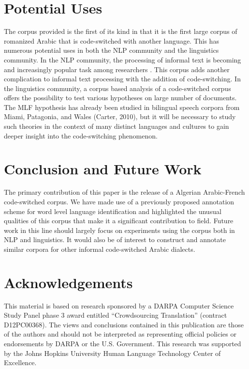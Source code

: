 \documentclass[10pt, a4paper]{article}
\begin{document}
\section{Potential Uses}
The corpus provided is the first of its kind in that it is the first
large corpus of romanized Arabic that is code-switched with another
language. This has numerous potential uses in both the NLP community
and the linguistics community. In the NLP community, the processing of
informal text is becoming and increasingly popular task among
researchers \cite{yang2013log}. This corpus adds another complication
to informal text processing with the addition of code-switching. In
the linguistics community, a corpus based analysis of a code-switched
corpus offers the possibility to test various hypotheses on large
number of documents. The MLF hypothesis has already been studied in
bilingual speech corpora from Miami, Patagonia, and Wales (Carter,
2010), but it will be necessary to study such theories in the context
of many distinct languages and cultures to gain deeper insight into
the code-switching phenomenon.


\section{Conclusion and Future Work}
The primary contribution of this paper is the release of a Algerian
Arabic-French code-switched corpus. We have made use of a previously
proposed annotation scheme for word level language identification and
highlighted the unusual qualities of this corpus that make it a
significant contribution to field. Future work in this line should
largely focus on experiments using the corpus both in NLP and
linguistics. It would also be of interest to construct and annotate
similar corpora for other informal code-switched Arabic dialects.


\section*{Acknowledgements}
This material is based on research sponsored by a DARPA Computer Science Study Panel phase 3 award entitled ``Crowdsourcing Translation'' (contract D12PC00368). The views and conclusions contained in this publication are those of the authors and should not be interpreted as representing official policies or endorsements by DARPA or the U.S. Government. This research was supported by the Johns Hopkins University Human Language Technology Center of Excellence.





\end{document}
